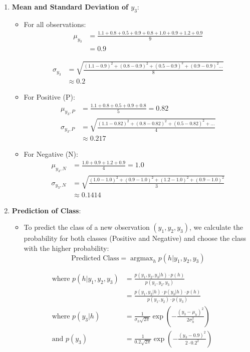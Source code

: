 \documentclass{article}
\DeclareMathOperator*{\argmax}{argmax}
\begin{document}
\begin{enumerate}[leftmargin=\labelsep]
\begin{enumerate}
  \item \textbf{Mean and Standard Deviation of \(y_3\)}:
  \begin{itemize}
      \item For all observations:  
      \begin{align*}
        \mu_{y_3} &= \frac{1.1 + 0.8 + 0.5 + 0.9 + 0.8 + 1.0 + 0.9 + 1.2 + 0.9}{9} \\ 
              &= 0.9
      \end{align*}
      
      \begin{align*}
        \sigma_{y_3} &= \sqrt{\frac{(1.1 - 0.9)^2 + (0.8 - 0.9)^2 + (0.5 - 0.9)^2 + (0.9 - 0.9)^2...}{8}} \\
                  &\approx 0.2
      \end{align*}
      
      \item For Positive (P):
      \begin{align*}
        \mu_{y_3,P} &= \frac{1.1 + 0.8 + 0.5 + 0.9 + 0.8}{5} = 0.82 \\
        \sigma_{y_3,P} &= \sqrt{\frac{(1.1 - 0.82)^2 + (0.8 - 0.82)^2 + (0.5 - 0.82)^2 + ...}{4}} \\
                  &\approx 0.217
      \end{align*}
      
      \item For Negative (N):
      \begin{align*}
        \mu_{y_3,N} &= \frac{1.0 + 0.9 + 1.2 + 0.9}{4} = 1.0 \\
        \sigma_{y_3,N} &= \sqrt{\frac{(1.0 - 1.0)^2 + (0.9 - 1.0)^2 + (1.2 - 1.0)^2 + (0.9 - 1.0)^2}{3}} \\
                  &\approx 0.1414
      \end{align*}

  \end{itemize}

  \item \textbf{Prediction of Class}:
  \begin{itemize}
      \item To predict the class of a new observation \((y_1, y_2, y_3)\), we calculate the probability for both classes (Positive and Negative) and choose the class with the higher probability:
      \[
      \text{Predicted Class} = \argmax_h p(h | y_1, y_2, y_3)
      \]
  \end{itemize}
  
  \begin{align*}
  \text{where } p(h | y_1, y_2, y_3) &= \frac{p(y_1, y_2, y_3 | h) \cdot p(h)}{p(y_1, y_2, y_3)} \\[10pt]
  &= \frac{p(y_1, y_2 | h) \cdot p(y_3 | h) \cdot p(h)}{p(y_1, y_2) \cdot p(y_3)} \\[10pt]
  \text{where } p(y_3 | h) &= \frac{1}{\sigma_h \sqrt{2\pi}} \exp\left(-\frac{(y_3 - \mu_h)^2}{2\sigma_h^2}\right) \\[10pt]
  \text{and } p(y_3) &= \frac{1}{0.2 \sqrt{2\pi}} \exp\left(-\frac{(y_3 - 0.9)^2}{2 \cdot 0.2^2}\right)
  \end{align*}


\end{enumerate}
\end{enumerate}
\end{document}
